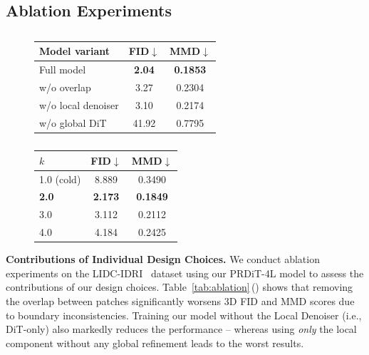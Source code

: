 \subsection{Ablation Experiments}\label{sec:abl}
\begin{table}[t]
\centering
\caption{
Ablation studies using our 4-layer variant PRDiT-4L on the LIDC-IDRI dataset.
The reported FID values are scaled by $10^3$, as is common practice.
() Contribution of the architecture's individual components.
() Effect of varying the predictor steps $k$ in our predictor-corrector setup.
}
\label{tab:ablation}
\begin{subfigure}[t]{0.48\textwidth}
\centering
\caption{}
\label{tab:ablation_components}
\begin{tabular}{lcc}
\toprule
Model variant & FID$\downarrow$ & MMD$\downarrow$ \\
\midrule
Full model            & \textbf{2.04} & \textbf{0.1853}  \\
w/o overlap           & 3.27 & 0.2304  \\
w/o local denoiser    & 3.10 & 0.2174 \\
w/o global DiT        & 41.92 & 0.7795 \\
\bottomrule
\end{tabular}
\end{subfigure}
\hfill
\begin{subfigure}[t]{0.48\textwidth}
\centering
\caption{}
\label{tab:ablation_k}
\begin{tabular}{lcc}
\toprule
$k$ & FID$\downarrow$ & MMD$\downarrow$ \\
\midrule
1.0 (cold) & 8.889 & 0.3490 \\
\textbf{2.0} & \textbf{2.173} & \textbf{0.1849} \\
3.0 & 3.112 & 0.2112 \\
4.0 & 4.184 & 0.2425 \\
\bottomrule
\end{tabular}
\end{subfigure}
\end{table}



\textbf{Contributions of Individual Design Choices.}\; We conduct ablation experiments on the LIDC\mbox{-}IDRI~\citep{armato2011lung} dataset using our PRDiT\mbox{-}4L model to assess the contributions of our design choices. Table~\ref{tab:ablation}\,() shows that removing the overlap between patches significantly worsens 3D FID and MMD scores due to boundary inconsistencies. Training our model without the Local Denoiser (i.e., DiT-only) also markedly reduces the performance -- whereas using \emph{only} the local component without any global refinement leads to the worst results.


